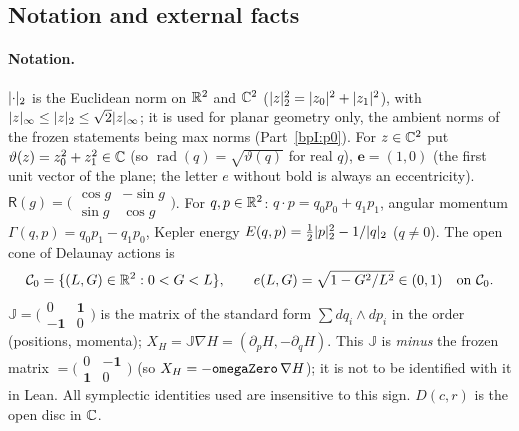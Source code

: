 \subsection{Notation and external facts}\label{bpI:p7:sec-ext}

\paragraph{Notation.} $\lvert \cdot\rvert_2$ is the Euclidean norm on $\mathbb{R}^2$ and $\mathbb{C}^2$ ($\lvert z\rvert_2^2=\lvert z_0\rvert^2+\lvert z_1\rvert^2$), with $\lvert z\rvert_\infty\le\lvert z\rvert_2\le\sqrt2\lvert z\rvert_\infty$; it is used for planar geometry
only, the ambient norms of the frozen statements being max norms (Part~\ref{bpI:p0}). For $z\in\mathbb{C}^2$ put $\vartheta(z)=z_0^2+z_1^2\in\mathbb{C}$ (so $\operatorname{rad}(q)=\sqrt{\vartheta(q)}$ for real $q$), $\mathbf e=(1,0)$ (the first unit vector of the plane; the letter $e$ without bold is always an eccentricity). $\mathsf R(g)=\bigl(\begin{smallmatrix}\cos g&-\sin g\\ \sin g&\cos g\end{smallmatrix}\bigr)$. For $q,p\in\mathbb{R}^2$:
$q\cdot p=q_0p_0+q_1p_1$, angular momentum $\Gamma(q,p)=q_0p_1-q_1p_0$, Kepler energy $E(q,p)=\tfrac12\lvert p\rvert_2^2-1/\lvert q\rvert_2$ ($q\ne0$). The open cone of Delaunay actions is
\[
\mathcal C_0=\{(L,G)\in\mathbb{R}^2:0<G<L\},\qquad e(L,G)=\sqrt{1-G^2/L^2}\in(0,1)\quad\text{on }\mathcal C_0.
\]
$\mathbb J=\bigl(\begin{smallmatrix}0&\mathbf 1\\-\mathbf 1&0\end{smallmatrix}\bigr)$ is the matrix of the standard form $\sum dq_i\wedge dp_i$ in the order (positions, momenta); $X_H=\mathbb J\nabla H=(\partial_pH,-\partial_qH)$. This $\mathbb J$ is \emph{minus} the frozen matrix $=\bigl(\begin{smallmatrix}0&-\mathbf 1\\\mathbf 1&0\end{smallmatrix}\bigr)$ (so $X_H=-\texttt{omegaZero}\,\nabla H$); it is not to be identified with it in Lean. All symplectic identities used are insensitive to this sign.
$D(c,r)$ is the open disc in $\mathbb{C}$.

